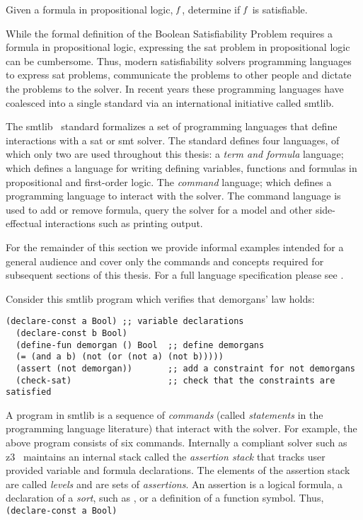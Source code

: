 \begin{definition}
  Given a formula in propositional logic, $\mathit{f}$, determine if $\mathit{f}$ is
  satisfiable.
\end{definition}

While the formal definition of the Boolean Satisfiability Problem requires a
formula in propositional logic, expressing the \ac{sat} problem in propositional
logic can be cumbersome. Thus, modern satisfiability solvers programming
languages to express \ac{sat} problems, communicate the problems to other people
and dictate the problems to the solver. In recent years these programming
languages have coalesced into a single standard via an international initiative
called \acl{smtlib}.

The \acl{smtlib}~\cite{BarFT-SMTLIB} standard formalizes a set of programming
languages that define interactions with a \ac{sat} or \ac{smt} solver. The
standard defines four languages, of which only two are used throughout this
thesis: a \emph{term and formula} language; which defines a language for writing
defining variables, functions and formulas in propositional and first-order
logic. The \emph{command} language; which defines a programming language to
interact with the solver. The command language is used to add or remove formula,
query the solver for a model and other side-effectual interactions such as
printing output.

For the remainder of this section we provide informal examples intended for a
general audience and cover only the commands and concepts required for
subsequent sections of this thesis. For a full language specification please see
\citet{BarFT-SMTLIB}.

Consider this \ac{smtlib} program
which verifies that demorgans' law holds:

\begin{lstlisting}[columns=flexible,keepspaces=true,language=SMTLIB]
  (declare-const a Bool) ;; variable declarations
  (declare-const b Bool)
  (define-fun demorgan () Bool  ;; define demorgans
  (= (and a b) (not (or (not a) (not b)))))
  (assert (not demorgan))       ;; add a constraint for not demorgans
  (check-sat)                   ;; check that the constraints are satisfied
\end{lstlisting}

A program in \ac{smtlib} is a sequence of \emph{commands} (called
\emph{statements} in the programming language literature) that interact with the
solver. For example, the above program consists of six commands. Internally a
compliant solver such as z3~\cite{10.1007/978-3-540-78800-3_24} maintains an
internal stack called the \emph{assertion stack} that tracks user provided
variable and formula declarations. The elements of the assertion stack are
called \emph{levels} and are sets of \emph{assertions}. An assertion is a
logical formula, a declaration of a \emph{sort}, such as , or a
definition of a function symbol. Thus, \lstinline{(declare-const a Bool)}


